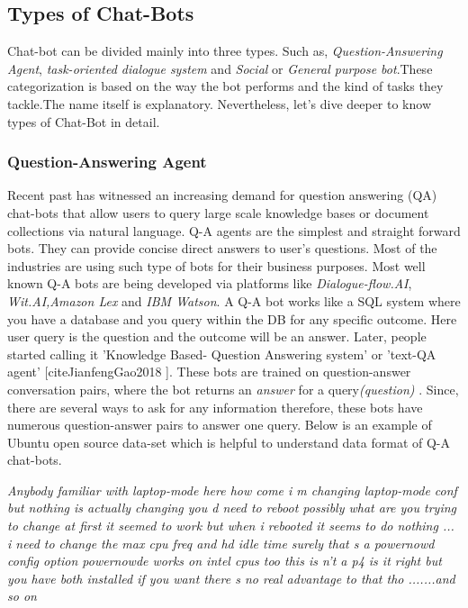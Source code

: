 \documentclass[a4paper,12pt]{article}
\begin{document}
\subsection{Types of Chat-Bots}
Chat-bot can be divided mainly into three types. Such as, \textit{Question-Answering Agent}, \textit{task-oriented dialogue system} and \textit{Social} or \textit{General purpose bot}.These categorization is based on the way the bot performs and the kind of tasks they tackle.The name itself  is explanatory. Nevertheless, let's dive deeper to know types of Chat-Bot in detail.  %

\subsubsection{Question-Answering Agent}
Recent past has witnessed an increasing demand for question answering (QA) chat-bots that allow users to query large scale knowledge bases or document collections via natural language. Q-A agents are the simplest and straight forward bots. They can provide concise direct answers to user's questions. Most of the industries are using such type of bots for their business purposes. Most well known Q-A bots are being developed via platforms like \textit{Dialogue-flow.AI},\textit{ Wit.AI,Amazon Lex} and \textit{IBM Watson}. A Q-A bot works like a SQL system where you have a database and you query within the DB for any specific outcome. Here user query is the question and the outcome will be an answer. Later, people started calling it 'Knowledge Based- Question Answering system' or 'text-QA agent' [cite{JianfengGao2018 }]. These bots are trained on question-answer conversation pairs, where the bot returns an \textit{answer} for a query\textit{(question)} . Since, there are several ways to ask for any information therefore, these bots have numerous question-answer pairs to answer one query. Below is an example of Ubuntu open source data-set which is helpful to understand data format of Q-A chat-bots.

\textit{Anybody familiar with laptop-mode here	how come i m changing laptop-mode conf but nothing is actually changing	 you d need to reboot possibly	what are you trying to change	at first it seemed to work but when i rebooted it seems to do nothing ...	i need to change the max cpu freq and hd idle time	surely that s a powernowd config option powernowde works on intel cpus too	this is n't a p4 is it	right but you have both installed	if you want	there s no real advantage to that tho .......and so on}
\end{document}
